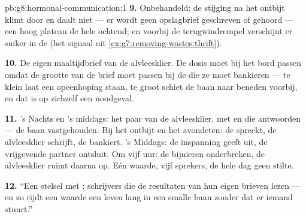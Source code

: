 \begin{solution}{pb:g8:hormonal-communication:1}
\textbf{9.} Onbehandeld: de stijging na het ontbijt klimt door en daalt
niet --- er wordt geen opslagbrief geschreven of gehoord --- een hoog
plateau de hele ochtend; en voorbij de terugwindrempel verschijnt er suiker
in de  (het signaal uit \cref{ex:g7:removing-wastes:thrift}).

\textbf{10.} De eigen maaltijdbrief van de alvleesklier. De dosis moet bij
het bord passen omdat de grootte van de brief moet passen bij de 
die ze moet bankieren --- te klein laat een opeenhoping staan, te groot
schiet de baan naar beneden voorbij, en dat is op zichzelf een noodgeval.

\textbf{11.} 's Nachts en 's middags: het paar van de alvleesklier, met
 en  die antwoorden --- de baan vastgehouden. Bij het ontbijt
en het avondeten: de  spreekt, de alvleesklier schrijft, de 
bankiert. 's Middags: de inspanning geeft uit, de vrijgevende partner
ontsluit. Om vijf uur: de bijnieren onderbreken, de alvleesklier ruimt
daarna op. Eén waarde, vijf sprekers, de hele dag geen stilte.

\textbf{12.} ``Een stelsel met : schrijvers die de
resultaten van hun eigen brieven lezen --- en zo rijdt een waarde een leven
lang in een smalle baan zonder dat er iemand stuurt.''
\end{solution}
